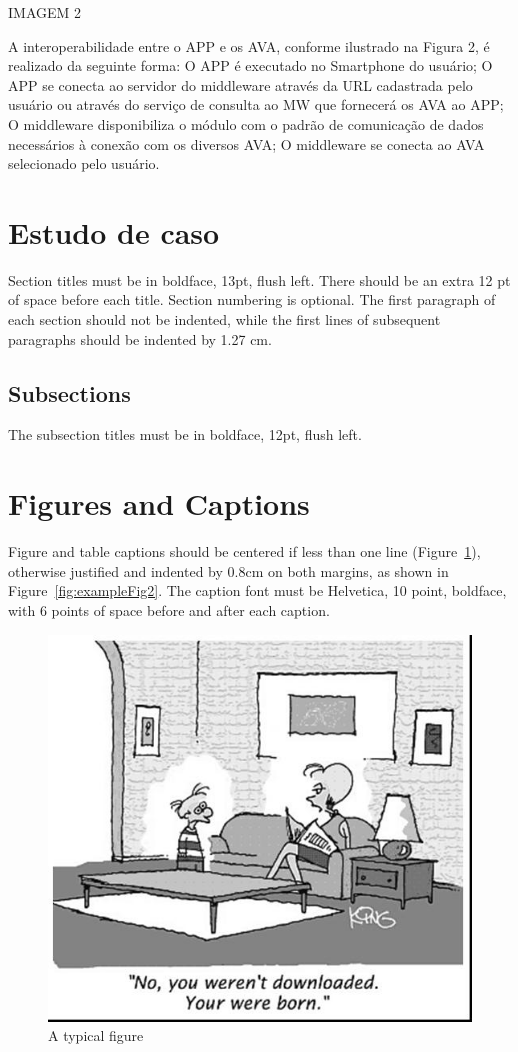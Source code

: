 \documentclass[12pt]{article}
\begin{document}
IMAGEM 2

A interoperabilidade entre o APP e os AVA, conforme ilustrado na Figura 2, é
realizado da seguinte forma:
O APP é executado no Smartphone do usuário;
O APP se conecta ao servidor do middleware através da URL cadastrada
pelo usuário ou através do serviço de consulta ao MW que fornecerá os
AVA ao APP;
O middleware disponibiliza o módulo com o padrão de comunicação de
dados necessários à conexão com os diversos AVA;
O middleware se conecta ao AVA selecionado pelo usuário.


\section{Estudo de caso}

Section titles must be in boldface, 13pt, flush left. There should be an extra
12 pt of space before each title. Section numbering is optional. The first
paragraph of each section should not be indented, while the first lines of
subsequent paragraphs should be indented by 1.27 cm.

\subsection{Subsections}

The subsection titles must be in boldface, 12pt, flush left.

\section{Figures and Captions}\label{sec:figs}


Figure and table captions should be centered if less than one line
(Figure~\ref{fig:exampleFig1}), otherwise justified and indented by 0.8cm on
both margins, as shown in Figure~\ref{fig:exampleFig2}. The caption font must
be Helvetica, 10 point, boldface, with 6 points of space before and after each
caption.

\begin{figure}[ht]
\centering
\includegraphics[width=.5\textwidth]{fig1.jpg}
\caption{A typical figure}
\label{fig:exampleFig1}
\end{figure}
\end{document}
